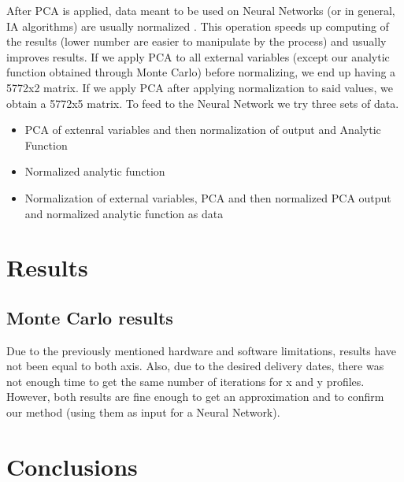 \documentclass[openany]{article}
\begin{document}
\newpage 

After PCA is applied, data meant to be used on Neural Networks (or in general, IA algorithms) are usually normalized \cite{589532}. This operation speeds up computing of the results (lower number are easier to manipulate by the process) and usually improves results. If we apply PCA to all external variables (except our analytic function obtained through Monte Carlo) before normalizing, we end up having a 5772x2 matrix. If we apply PCA after applying normalization to said values, we obtain a 5772x5 matrix. To feed to the Neural Network we try three sets of data.

\begin{itemize}
    \item PCA of extenral variables and then normalization of output and Analytic Function
    \item Normalized analytic function
    \item Normalization of external variables, PCA and then normalized PCA output and normalized  analytic function as data
\end{itemize}




\newpage 

\section{Results}

\subsection{Monte Carlo results}

Due to the previously mentioned hardware and software limitations, results have not been equal to both axis. Also, due to the desired delivery dates, there was not enough time to get the same number of iterations for x and y profiles. However, both results are fine enough to get an approximation and to confirm our method (using them as input for a Neural Network).

\subsection{}

\newpage

\newpage

\section{Conclusions}
\end{document}
